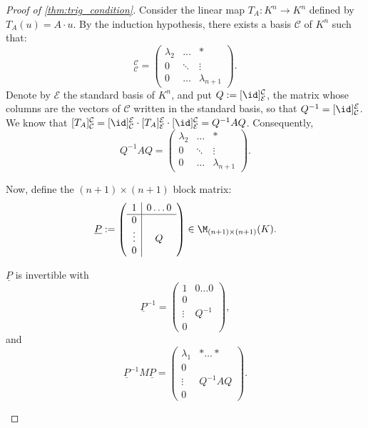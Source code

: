 \begin{proof}[Proof of \cref{thm:trig_condition}]
  Consider the linear map $T_A : K^n \rightarrow K^n$ defined by $T_A(u) = A \cdot u$.
  By the induction hypothesis, there exists a basis $\mathcal{C}$ of $K^n$ such that:
  \begin{equation}
    [T_A]_{\mathcal{C}}^{\mathcal{C}} = \begin{pmatrix} \lambda_2 & \dots & * \\ 0 & \ddots & \vdots \\ 0 & \dots & \lambda_{n+1} \end{pmatrix}.
  \end{equation}
  Denote by $\mathcal{E}$ the standard basis of $K^n$, and put $Q := [\id]_{\mathcal{E}}^{\mathcal{C}}$, the matrix whose columns are the vectors of $\mathcal{C}$ written in the standard basis, so that $Q^{-1} = [\id]_{\mathcal{C}}^{\mathcal{E}}$. We know that $[T_A]_{\mathcal{C}}^{\mathcal{C}} = [\id]_{\mathcal{C}}^{\mathcal{E}} \cdot [T_A]_{\mathcal{E}}^{\mathcal{E}} \cdot [\id]_{\mathcal{E}}^{\mathcal{C}} = Q^{-1}AQ$.
  Consequently,
  \[
  Q^{-1}AQ = \begin{pmatrix} \lambda_2 & \dots & * \\ 0 & \ddots & \vdots \\ 0 & \dots & \lambda_{n+1} \end{pmatrix}.
  \]
  
  \noindent
  Now, define the $(n+1) \times (n+1)$ block matrix:
  \begin{equation} \label{eq:P_underline}
    \underline{P} := \left(\begin{array}{c|c} 1 & 0 \dots 0 \\ \hline 0 & \\ \vdots & Q \\ 0 & \end{array}\right) \in \M_{(n+1) \times (n+1)}(K).
  \end{equation}

  \begin{claim*}\label{claim:P_invertible_trig}
    $\underline{P}$ is invertible with
    \[
    \underline{P}^{-1} = \left(\begin{array}{c|c} 1 & 0 \dots 0 \\ \hline 0 & \\ \vdots & Q^{-1} \\ 0 & \end{array}\right),
    \]
    and
    \[
    \underline{P}^{-1}M\underline{P} = \left(\begin{array}{c|c} \lambda_1 & * \dots * \\ \hline 0 & \\ \vdots & Q^{-1}AQ \\ 0 & \end{array}\right).
    \]
  \end{claim*}


\end{proof}
